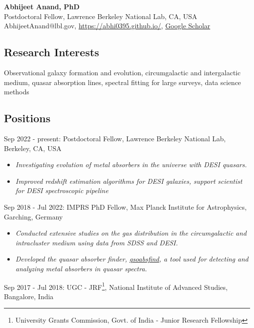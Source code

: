 \documentclass[12pt,letterpaper]{article}
\begin{document}
\thispagestyle{empty}\sloppy\sloppypar\raggedbottom

\textbf{\Large Abhijeet Anand, PhD}\\[0.5ex]
Postdoctoral Fellow, Lawrence Berkeley National Lab, CA, USA\\[0.5ex]
\textsf{\small AbhijeetAnand@lbl.gov, \href{https://abhi0395.github.io/}{https://abhi0395.github.io/}, \href{https://scholar.google.com/citations?hl=en&user=MfOuq1IAAAAJ}{Google Scholar}}\\[0.5ex]

\subsection{Research Interests}
Observational galaxy formation and evolution, circumgalactic and intergalactic medium, quasar absorption lines, spectral fitting for large surveys, data science methods

\subsection{Positions}
\begin{list}{}{\cvlist}
\item Sep 2022 - present: Postdoctoral Fellow, Lawrence Berkeley National Lab, Berkeley, CA, USA \\
\begin{itemize}
  \item \emph{Investigating evolution of metal absorbers in the universe with DESI quasars.}
  \item \emph{Improved redshift estimation algorithms for DESI galaxies, support scientist for DESI spectroscopic pipeline}
\end{itemize}
\item Sep 2018 - Jul 2022: IMPRS PhD Fellow, Max Planck Institute for Astrophysics, Garching, Germany
\begin{itemize}
\item \emph{Conducted extensive studies on the gas distribution in the circumgalactic and intracluster medium using data from SDSS and DESI.}
\item \emph{Developed the quasar absorber finder, \href{https://github.com/abhi0395/qsoabsfind}{qsoabsfind}, a tool used for detecting and analyzing metal absorbers in quasar spectra.}
\end{itemize}
\item Sep 2017 - Jul 2018: UGC - JRF\footnote{University Grants Commission, Govt. of India - Junior Research Fellowship}, National Institute of Advanced Studies, Bangalore, India
\end{list}
\end{document}
